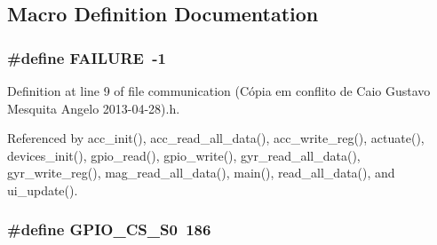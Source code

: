 \subsection{Macro Definition Documentation}
\hypertarget{communication_01_07C_xC3_xB3pia_01em_01conflito_01de_01Caio_01Gustavo_01Mesquita_01Angelo_012013-04-28_08_8h_a6d58f9ac447476b4e084d7ca383f5183}{
\subsubsection[{F\-A\-I\-L\-U\-R\-E}]{\setlength{\rightskip}{0pt plus 5cm}\#define F\-A\-I\-L\-U\-R\-E~-\/1}}\label{communication_01_07C_xC3_xB3pia_01em_01conflito_01de_01Caio_01Gustavo_01Mesquita_01Angelo_012013-04-28_08_8h_a6d58f9ac447476b4e084d7ca383f5183}


Definition at line 9 of file communication (\-Cópia em conflito de Caio Gustavo Mesquita Angelo 2013-\/04-\/28).\-h.



Referenced by acc\-\_\-init(), acc\-\_\-read\-\_\-all\-\_\-data(), acc\-\_\-write\-\_\-reg(), actuate(), devices\-\_\-init(), gpio\-\_\-read(), gpio\-\_\-write(), gyr\-\_\-read\-\_\-all\-\_\-data(), gyr\-\_\-write\-\_\-reg(), mag\-\_\-read\-\_\-all\-\_\-data(), main(), read\-\_\-all\-\_\-data(), and ui\-\_\-update().

\hypertarget{communication_01_07C_xC3_xB3pia_01em_01conflito_01de_01Caio_01Gustavo_01Mesquita_01Angelo_012013-04-28_08_8h_a48ea000c2b251ce26ea35d300f319651}{
\subsubsection[{G\-P\-I\-O\-\_\-\-C\-S\-\_\-\-S0}]{\setlength{\rightskip}{0pt plus 5cm}\#define G\-P\-I\-O\-\_\-\-C\-S\-\_\-\-S0~186}}\label{communication_01_07C_xC3_xB3pia_01em_01conflito_01de_01Caio_01Gustavo_01Mesquita_01Angelo_012013-04-28_08_8h_a48ea000c2b251ce26ea35d300f319651}


